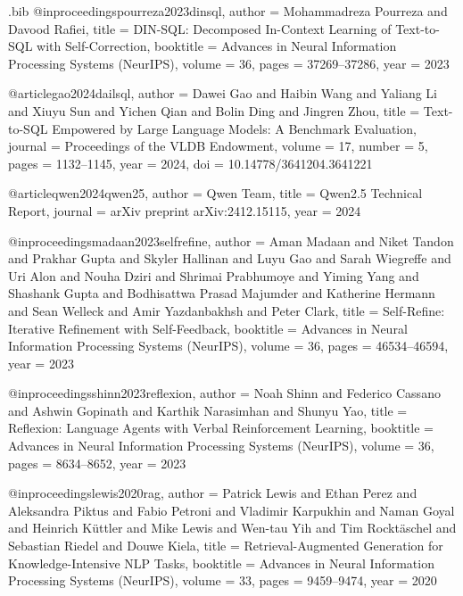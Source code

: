 \begin{filecontents*}{\jobname.bib}
@inproceedings{pourreza2023dinsql,
  author    = {Mohammadreza Pourreza and Davood Rafiei},
  title     = {{DIN-SQL}: Decomposed In-Context Learning of Text-to-{SQL} with Self-Correction},
  booktitle = {Advances in Neural Information Processing Systems (NeurIPS)},
  volume    = {36},
  pages     = {37269--37286},
  year      = {2023}
}

@article{gao2024dailsql,
  author    = {Dawei Gao and Haibin Wang and Yaliang Li and Xiuyu Sun and Yichen Qian and Bolin Ding and Jingren Zhou},
  title     = {Text-to-{SQL} Empowered by Large Language Models: A Benchmark Evaluation},
  journal   = {Proceedings of the VLDB Endowment},
  volume    = {17},
  number    = {5},
  pages     = {1132--1145},
  year      = {2024},
  doi       = {10.14778/3641204.3641221}
}

@article{qwen2024qwen25,
  author    = {{Qwen Team}},
  title     = {{Qwen2.5} Technical Report},
  journal   = {arXiv preprint arXiv:2412.15115},
  year      = {2024}
}

@inproceedings{madaan2023selfrefine,
  author    = {Aman Madaan and Niket Tandon and Prakhar Gupta and Skyler Hallinan and Luyu Gao and Sarah Wiegreffe and Uri Alon and Nouha Dziri and Shrimai Prabhumoye and Yiming Yang and Shashank Gupta and Bodhisattwa Prasad Majumder and Katherine Hermann and Sean Welleck and Amir Yazdanbakhsh and Peter Clark},
  title     = {Self-Refine: Iterative Refinement with Self-Feedback},
  booktitle = {Advances in Neural Information Processing Systems (NeurIPS)},
  volume    = {36},
  pages     = {46534--46594},
  year      = {2023}
}

@inproceedings{shinn2023reflexion,
  author    = {Noah Shinn and Federico Cassano and Ashwin Gopinath and Karthik Narasimhan and Shunyu Yao},
  title     = {Reflexion: Language Agents with Verbal Reinforcement Learning},
  booktitle = {Advances in Neural Information Processing Systems (NeurIPS)},
  volume    = {36},
  pages     = {8634--8652},
  year      = {2023}
}

@inproceedings{lewis2020rag,
  author    = {Patrick Lewis and Ethan Perez and Aleksandra Piktus and Fabio Petroni and Vladimir Karpukhin and Naman Goyal and Heinrich K{\"u}ttler and Mike Lewis and Wen-tau Yih and Tim Rockt{\"a}schel and Sebastian Riedel and Douwe Kiela},
  title     = {Retrieval-Augmented Generation for Knowledge-Intensive {NLP} Tasks},
  booktitle = {Advances in Neural Information Processing Systems (NeurIPS)},
  volume    = {33},
  pages     = {9459--9474},
  year      = {2020}
}


\end{filecontents*}
